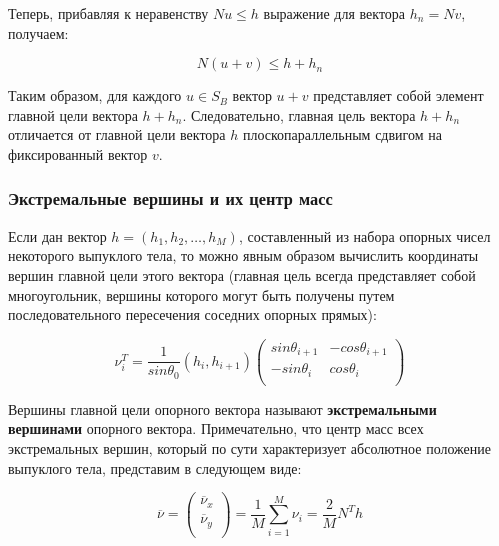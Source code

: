 \documentclass[a4paper, 12pt, titlepage]{article}
\theoremstyle{definition}
\theoremstyle{plain}
\begin{document}
Теперь, прибавляя к неравенству $N u \leq h$ выражение для вектора
$h_{n} = N v$, получаем:
  
\begin{equation}
N (u + v) \leq h + h_{n}
\end{equation}

Таким образом, для каждого $u \in S_{B}$ вектор $u + v$ представляет собой
элемент главной цели вектора $h + h_{n}$. Следовательно, главная цель вектора
$h + h_{n}$ отличается от главной цели вектора $h$ плоскопараллельным сдвигом на
фиксированный вектор $v$.

\subsubsection{Экстремальные вершины и их центр масс}
\label{sec:history/PrinceW90/extreme-points}

Если дан вектор $h = (h_{1}, h_{2}, \ldots, h_{M})$, составленный из набора
опорных чисел некоторого выпуклого тела, то можно явным образом вычислить
координаты вершин главной цели этого вектора (главная цель всегда представляет
собой многоугольник, вершины которого могут быть получены путем
последовательного пересечения соседних опорных прямых):

\begin{equation}
\nu_{i}^{T} = \frac{1}{sin \theta_{0}} (h_{i},  h_{i + 1})
\left(
  \begin{array}{cc}
    sin \theta_{i + 1} & - cos \theta_{i + 1} \\
    - sin \theta_{i} & cos \theta_{i} \\
  \end{array}
\right)
\end{equation}

Вершины главной цели опорного вектора называют \textbf{экстремальными вершинами}
опорного вектора. Примечательно, что центр масс всех экстремальных вершин,
который по сути характеризует абсолютное положение выпуклого тела, представим
в следующем виде:

\begin{equation}
\overline{\nu} = \left(
  \begin{array}{c}
   \overline{\nu}_{x} \\
   \overline{\nu}_{y} \\
  \end{array}
  \right) =
  \frac{1}{M} \sum\limits_{i = 1}^{M} \nu_{i} = \frac{2}{M} N^{T} h
\end{equation}
\end{document}

